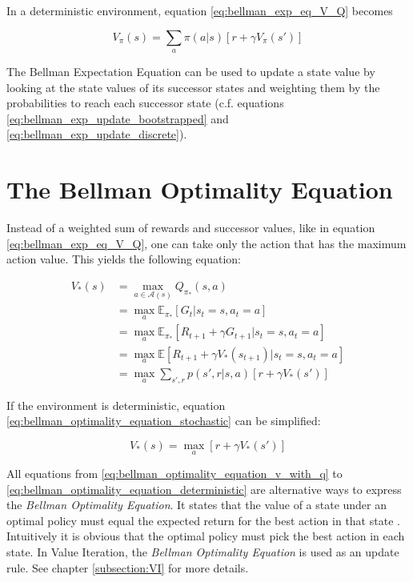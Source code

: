 In a deterministic environment, equation \ref{eq:bellman_exp_eq_V_Q} becomes

\begin{equation}
V_\pi(s)= \sum_a \pi(a|s)[r+\gamma V_{\pi}(s')]
\label{eq:bellman_exp_eq_V_determinisic}
\end{equation}

The Bellman Expectation Equation can be used to update a state value by looking at the state values of its successor states and weighting them by the probabilities to reach each successor state (c.f. equations \ref{eq:bellman_exp_update_bootstrapped} and \ref{eq:bellman_exp_update_discrete}).

\section{The Bellman Optimality Equation}

Instead of a weighted sum of rewards and successor values, like in equation \ref{eq:bellman_exp_eq_V_Q}, one can take only the action that has the maximum action value. This yields the following equation:

\begin{align}
V_*(s)&=\max_{a \in \mathcal{A}(s)} Q_{\pi_*}(s,a) \label{eq:bellman_optimality_equation_v_with_q}\\
&=\max_{a}\mathbb{E}_{\pi_*}[G_t|s_t=s,a_t=a]\\
&=\max_{a}\mathbb{E}_{\pi_*}[R_{t+1} + \gamma G_{t+1}|s_t=s,a_t=a]\\
&=\max_{a}\mathbb{E}[R_{t+1} + \gamma V_*(s_{t+1})|s_t=s,a_t=a]\\
&=\max_{a}\sum_{s',r}p(s',r|s,a)[r + \gamma V_*(s')]
\label{eq:bellman_optimality_equation_stochastic}
\end{align}

If the environment is deterministic, equation \ref{eq:bellman_optimality_equation_stochastic} can be simplified:

\begin{equation}
V_*(s) = \max_a[r+\gamma V_*(s')]
\label{eq:bellman_optimality_equation_deterministic}
\end{equation}

All equations from \ref{eq:bellman_optimality_equation_v_with_q} to \ref{eq:bellman_optimality_equation_deterministic} are alternative ways to express the \textit{Bellman Optimality Equation}. It states that the value of a state under an optimal policy must equal the expected return for the best action in that state \cite{SuttonBarto2018}. Intuitively it is obvious that the optimal policy must pick the best action in each state. In Value Iteration, the \textit{Bellman Optimality Equation} is used as an update rule. See chapter \ref{subsection:VI} for more details.